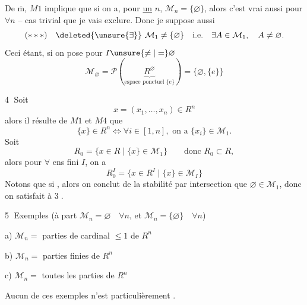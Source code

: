 
De $\overline{\mathrm m}$,  $M1$ implique que si on a, pour \uline{un} $n$,  $\mathcal M_n=\{\varnothing\}$, alors c'est vrai aussi pour $\forall n$ -- cas trivial  que je vais exclure. Donc je suppose aussi
\[
(***)\quad\deleted{\unsure{\exists}}\ \mathcal M_1\ne\{\varnothing\}\quad\text{i.e.}\quad\exists A\in\mathcal M_1,\quad A\ne\varnothing.
\]
Ceci étant, si on pose pour $I\unsure{\ne|=}\varnothing$
\[
\mathcal M_\varnothing=\mathcal P(\underbrace{R^\varnothing}_{\text{espace ponctuel }\{e\}})=\{\varnothing,\{e\}\}
\]

\textcircled{4} Soit 
\[
x=(x_1,\ldots,x_n)\in R^n
\]
alors il résulte de $M1$ et $M4$ que
\[
\{x\}\in R^n\Longleftrightarrow\forall i\in[1,n],\text{ on a }\{x_i\}\in\mathcal M_1.
\]
Soit
\[
R_0=\{x\in R\mid\{x\}\in\mathcal M_1\}\qquad\text{donc }R_0\subset R,
\]
alors pour $\forall$ ens fini $I$, on a
\[
R_0^I=\{x\in R^I\mid\{x\}\in\mathcal M_I\}
\]
Notons que si  , alors on conclut de la stabilité  par intersection que $\varnothing\in\mathcal M_1$, donc on satisfait à \textcircled{3}.

\textcircled{5} Exemples (à part $\mathcal M_n=\varnothing\quad\forall n$, et $\mathcal M_n=\{\varnothing\}\quad\forall n$)

a) $\mathcal M_n=$ parties de cardinal $\le1$ de $R^n$

b) $\mathcal M_n=$ parties finies de $R^n$

c) $\mathcal M_n=$ toutes les parties de $R^n$


Aucun de ces exemples n'est particulièrement .


